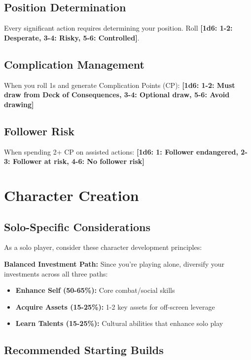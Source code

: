 \documentclass[11pt]{article}
\newcommand{\dice}[1]{\textbf{[1d6: #1]}}
\begin{document}
\subsection{Position Determination}

Every significant action requires determining your position. Roll \dice{1-2: Desperate, 3-4: Risky, 5-6: Controlled}.

\subsection{Complication Management}

When you roll 1s and generate Complication Points (CP):
\dice{1-2: Must draw from Deck of Consequences, 3-4: Optional draw, 5-6: Avoid drawing}

\subsection{Follower Risk}

When spending 2+ CP on assisted actions:
\dice{1: Follower endangered, 2-3: Follower at risk, 4-6: No follower risk}

\section{Character Creation}

\subsection{Solo-Specific Considerations}

As a solo player, consider these character development principles:

\begin{framed}
\textbf{Balanced Investment Path:} Since you're playing alone, diversify your investments across all three paths:
\begin{itemize}
    \item \textbf{Enhance Self (50-65\%):} Core combat/social skills
    \item \textbf{Acquire Assets (15-25\%):} 1-2 key assets for off-screen leverage
    \item \textbf{Learn Talents (15-25\%):} Cultural abilities that enhance solo play
\end{itemize}
\end{framed}

\subsection{Recommended Starting Builds}
\end{document}
